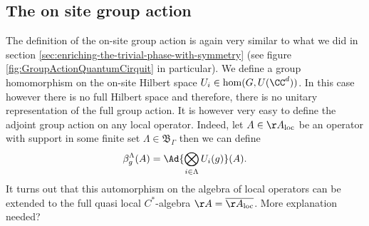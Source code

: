 \subsection{The on site group action}
The definition of the on-site group action is again very similar to what we did in section \ref{sec:enriching-the-trivial-phase-with-symmetry} (see figure \ref{fig:GroupActionQuantumCirquit} in particular). We define a group homomorphism on the on-site Hilbert space $U_i\in\hom(G,U(\CC^d))$. In this case however there is no full Hilbert space and therefore, there is no unitary representation of the full group action. It is however very easy to define the adjoint group action on any local operator. Indeed, let $A\in\AA_{\text{loc}}$ be an operator with support in some finite set $\Lambda\in\mathfrak{B}_{\Gamma}$ then we can define
\begin{equation}
	\beta^\Lambda_{g}(A)=\Ad{\bigotimes_{i\in\Lambda}U_i(g)}(A).
\end{equation}
It turns out that this automorphism on the algebra of local operators can be extended to the full quasi local $C^*$-algebra $\AA=\overline{\AA_{\text{loc}}}$. {\color{red}More explanation needed?}
